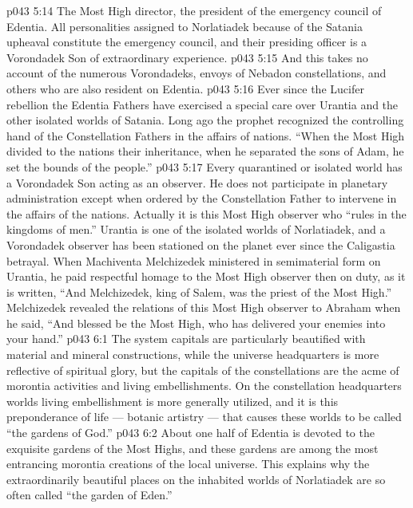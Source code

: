 \vs p043 5:14 \bibnobreakspace The Most High director, the president of the emergency council of Edentia. All personalities assigned to Norlatiadek because of the Satania upheaval constitute the emergency council, and their presiding officer is a Vorondadek Son of extraordinary experience.
\vs p043 5:15 And this takes no account of the numerous Vorondadeks, envoys of Nebadon constellations, and others who are also resident on Edentia.
\vs p043 5:16 \pc Ever since the Lucifer rebellion the Edentia Fathers have exercised a special care over Urantia and the other isolated worlds of Satania. Long ago the prophet recognized the controlling hand of the Constellation Fathers in the affairs of nations. “When the Most High divided to the nations their inheritance, when he separated the sons of Adam, he set the bounds of the people.”
\vs p043 5:17 Every quarantined or isolated world has a Vorondadek Son acting as an observer. He does not participate in planetary administration except when ordered by the Constellation Father to intervene in the affairs of the nations. Actually it is this Most High observer who “rules in the kingdoms of men.” Urantia is one of the isolated worlds of Norlatiadek, and a Vorondadek observer has been stationed on the planet ever since the Caligastia betrayal. When Machiventa Melchizedek ministered in semimaterial form on Urantia, he paid respectful homage to the Most High observer then on duty, as it is written, “And Melchizedek, king of Salem, was the priest of the Most High.” Melchizedek revealed the relations of this Most High observer to Abraham when he said, “And blessed be the Most High, who has delivered your enemies into your hand.”
\vs p043 6:1 The system capitals are particularly beautified with material and mineral constructions, while the universe headquarters is more reflective of spiritual glory, but the capitals of the constellations are the acme of morontia activities and living embellishments. On the constellation headquarters worlds living embellishment is more generally utilized, and it is this preponderance of life --- botanic artistry --- that causes these worlds to be called “the gardens of God.”
\vs p043 6:2 \pc About one half of Edentia is devoted to the exquisite gardens of the Most Highs, and these gardens are among the most entrancing morontia creations of the local universe. This explains why the extraordinarily beautiful places on the inhabited worlds of Norlatiadek are so often called “the garden of Eden.”
